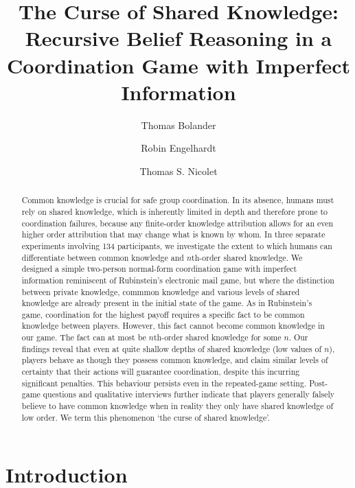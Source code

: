 \documentclass[submission,copyright,creativecommons]{eptcs}
\title{The Curse of Shared Knowledge: Recursive Belief Reasoning in a Coordination Game with Imperfect Information}
\author{Thomas Bolander
\institute{Technical University of Denmark \\
Kgs.\ Lyngby, Denmark}
\email{tobo@dtu.dk}
\and
Robin Engelhardt
\and 
Thomas S. Nicolet
}
\begin{document}
\maketitle

\begin{abstract}
Common knowledge is crucial for safe group coordination. In its absence, humans must rely on shared knowledge, 
which is inherently limited in depth and therefore prone to coordination failures, because any finite-order knowledge attribution allows for an even higher order attribution that may change what is known by whom. In three separate experiments involving 134 participants, we investigate the extent to which humans can differentiate between common knowledge and $n$th-order shared knowledge. We designed a simple two-person normal-form coordination game with imperfect information reminiscent of Rubinstein's electronic mail game, but where the distinction between private knowledge, commmon knowledge and various levels of shared knowledge are already present in the initial state of the game. As in Rubinstein's game, coordination for the highest payoff requires a specific fact to be common knowledge between players. However, this fact cannot become common knowledge in our game. The fact can at most be $n$th-order shared knowledge for some $n$. Our findings reveal that even at quite shallow depths of shared knowledge (low values of $n$), players behave as though they possess common knowledge, and claim similar levels of certainty that their actions will guarantee coordination, despite this incurring significant penalties. This behaviour persists even in the repeated-game setting. Post-game questions and qualitative interviews further indicate that players generally falsely believe to have common knowledge when in reality they only have shared knowledge of low order.  We term this phenomenon `the curse of shared knowledge'.
\end{abstract}








\section{Introduction}
\end{document}
